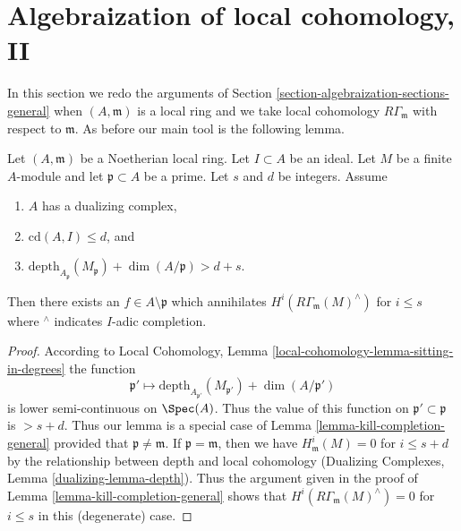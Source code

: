 \section{Algebraization of local cohomology, II}
\label{section-algebraization-punctured}

\noindent
In this section we redo the arguments of
Section \ref{section-algebraization-sections-general}
when $(A, \mathfrak m)$ is a local ring and we take local cohomology
$R\Gamma_\mathfrak m$ with respect to $\mathfrak m$. As before our
main tool is the following lemma.

\begin{lemma}
\label{lemma-kill-completion}
Let $(A, \mathfrak m)$ be a Noetherian local ring.
Let $I \subset A$ be an ideal. Let $M$ be a finite $A$-module and
let $\mathfrak p \subset A$ be a prime. Let $s$ and $d$ be integers. Assume
\begin{enumerate}
\item $A$ has a dualizing complex,
\item $\text{cd}(A, I) \leq d$, and
\item
$\text{depth}_{A_\mathfrak p}(M_\mathfrak p) + \dim(A/\mathfrak p) > d + s$.
\end{enumerate}
Then there exists an $f \in A \setminus \mathfrak p$ which annihilates
$H^i(R\Gamma_\mathfrak m(M)^\wedge)$ for $i \leq s$ where ${}^\wedge$
indicates $I$-adic completion.
\end{lemma}

\begin{proof}
According to Local Cohomology, Lemma
\ref{local-cohomology-lemma-sitting-in-degrees}
the function
$$
\mathfrak p' \longmapsto
\text{depth}_{A_{\mathfrak p'}}(M_{\mathfrak p'}) + \dim(A/\mathfrak p')
$$
is lower semi-continuous on $\Spec(A)$. Thus the value
of this function on $\mathfrak p' \subset \mathfrak p$
is $> s + d$. Thus our lemma is a special case of
Lemma \ref{lemma-kill-completion-general}
provided that $\mathfrak p \not = \mathfrak m$.
If $\mathfrak p = \mathfrak m$,
then we have $H^i_\mathfrak m(M) = 0$ for $i \leq s + d$ by
the relationship between depth and local cohomology
(Dualizing Complexes, Lemma \ref{dualizing-lemma-depth}).
Thus the argument given in the proof of
Lemma \ref{lemma-kill-completion-general}
shows that $H^i(R\Gamma_\mathfrak m(M)^\wedge) = 0$
for $i \leq s$ in this (degenerate) case.
\end{proof}


